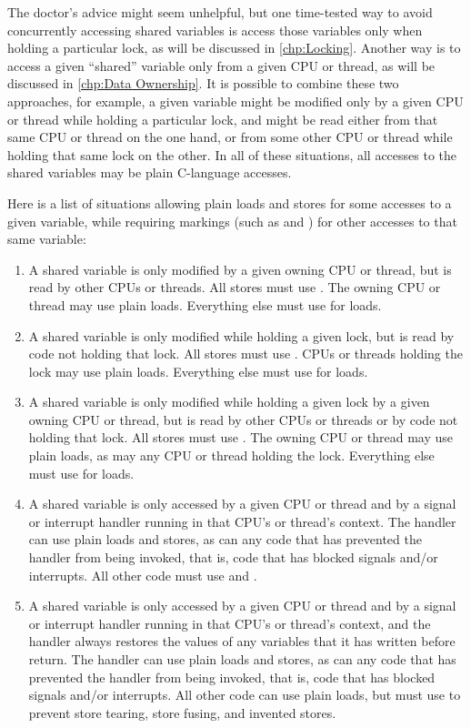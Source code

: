 The doctor's advice might seem unhelpful, but
one time-tested way to avoid concurrently accessing shared variables
is access those variables only when holding a particular lock, as will
be discussed in \cref{chp:Locking}.
Another way is to access a given ``shared'' variable only from a given
CPU or thread, as will be discussed in
\cref{chp:Data Ownership}.
It is possible to combine these two approaches, for example, a given
variable might be modified only by a given CPU or thread while holding a
particular lock, and might be read either from that same CPU or thread
on the one hand, or from some other CPU or thread while holding that
same lock on the other.
In all of these situations, all accesses to the shared variables may
be plain C-language accesses.

Here is a list of situations
allowing plain loads and stores for some accesses to a given variable,
while requiring markings (such as  and )
for other accesses to that same variable:

\begin{enumerate}
\item	A shared variable is only modified by a given owning CPU or
	thread, but is read by other CPUs or threads.
	All stores must use .
	The owning CPU or thread may use plain loads.
	Everything else must use  for loads.
\item	A shared variable is only modified while holding a given
	lock, but is read by code not holding that lock.
	All stores must use .
	CPUs or threads holding the lock may use plain loads.
	Everything else must use  for loads.
\item	A shared variable is only modified while holding a given
	lock by a given owning CPU or thread, but is read by other
	CPUs or threads or by code not holding that lock.
	All stores must use .
	The owning CPU or thread may use plain loads, as may any
	CPU or thread holding the lock.
	Everything else must use  for loads.
\item	A shared variable is only accessed by a given CPU or thread
	and by a signal or interrupt handler running in that CPU's
	or thread's context.
	The handler can use plain loads and stores, as can any code
	that has prevented the handler from being invoked, that is,
	code that has blocked signals and/or interrupts.
	All other code must use  and .
\item	A shared variable is only accessed by a given CPU or thread
	and by a signal or interrupt handler running in that CPU's
	or thread's context, and the handler always restores the values of any
	variables that it has written before return.
	The handler can use plain loads and stores, as can any code
	that has prevented the handler from being invoked, that is,
	code that has blocked signals and/or interrupts.
	All other code can use plain loads, but must use 
	to prevent store tearing, store fusing, and invented stores.
\end{enumerate}

